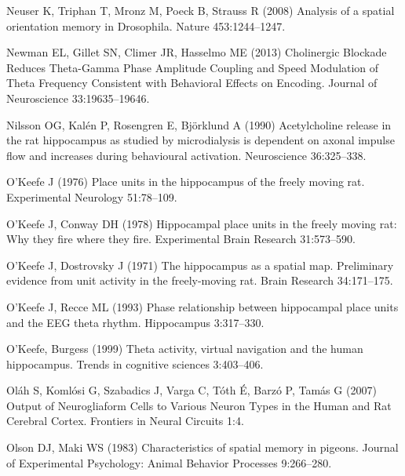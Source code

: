 \documentclass[
  12pt,
  a4paper,
  openany]{book}
\newlength{\cslhangindent}
\newlength{\cslentryspacingunit} %
\newenvironment{CSLReferences}[2] %
 {%
  \setlength{\parindent}{0pt}
  \ifodd #1
  \let\oldpar\par
  \def\par{\hangindent=\cslhangindent\oldpar}
  \fi
  \setlength{\parskip}{#2\cslentryspacingunit}
 }%
 {}
\begin{document}
\begin{CSLReferences}{1}{0}
\leavevmode{}%
Neuser K, Triphan T, Mronz M, Poeck B, Strauss R (2008) Analysis of a spatial orientation memory in {Drosophila}. Nature 453:1244--1247.

\leavevmode{}%
Newman EL, Gillet SN, Climer JR, Hasselmo ME (2013) Cholinergic {Blockade} {Reduces} {Theta}-{Gamma} {Phase} {Amplitude} {Coupling} and {Speed} {Modulation} of {Theta} {Frequency} {Consistent} with {Behavioral} {Effects} on {Encoding}. Journal of Neuroscience 33:19635--19646.

\leavevmode{}%
Nilsson OG, Kalén P, Rosengren E, Björklund A (1990) Acetylcholine release in the rat hippocampus as studied by microdialysis is dependent on axonal impulse flow and increases during behavioural activation. Neuroscience 36:325--338.

\leavevmode{}%
O'Keefe J (1976) Place units in the hippocampus of the freely moving rat. Experimental Neurology 51:78--109.

\leavevmode{}%
O'Keefe J, Conway DH (1978) Hippocampal place units in the freely moving rat: Why they fire where they fire. Experimental Brain Research 31:573--590.

\leavevmode{}%
O'Keefe J, Dostrovsky J (1971) The hippocampus as a spatial map. {Preliminary} evidence from unit activity in the freely-moving rat. Brain Research 34:171--175.

\leavevmode{}%
O'Keefe J, Recce ML (1993) Phase relationship between hippocampal place units and the {EEG} theta rhythm. Hippocampus 3:317--330.

\leavevmode{}%
O'Keefe, Burgess (1999) Theta activity, virtual navigation and the human hippocampus. Trends in cognitive sciences 3:403--406.

\leavevmode{}%
Oláh S, Komlósi G, Szabadics J, Varga C, Tóth É, Barzó P, Tamás G (2007) Output of {Neurogliaform} {Cells} to {Various} {Neuron} {Types} in the {Human} and {Rat} {Cerebral} {Cortex}. Frontiers in Neural Circuits 1:4.

\leavevmode{}%
Olson DJ, Maki WS (1983) Characteristics of spatial memory in pigeons. Journal of Experimental Psychology: Animal Behavior Processes 9:266--280.


\end{CSLReferences}
\end{document}

